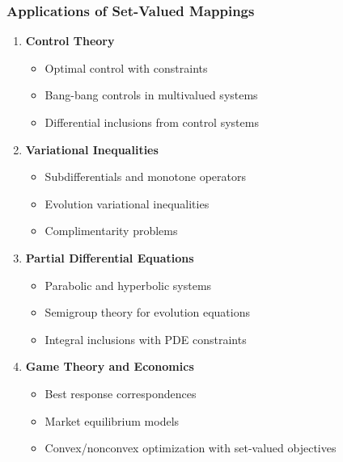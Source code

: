 \documentclass[aspectratio=169,10pt]{beamer}
\begin{document}
\begin{frame}
\frametitle{Applications of Set-Valued Mappings}

\begin{enumerate}
    \item \textbf{Control Theory}
    \begin{itemize}
        \item Optimal control with constraints
        \item Bang-bang controls in multivalued systems
        \item Differential inclusions from control systems
    \end{itemize}

    \vspace{0.3cm}

    \item \textbf{Variational Inequalities}
    \begin{itemize}
        \item Subdifferentials and monotone operators
        \item Evolution variational inequalities
        \item Complimentarity problems
    \end{itemize}

    \vspace{0.3cm}

    \item \textbf{Partial Differential Equations}
    \begin{itemize}
        \item Parabolic and hyperbolic systems
        \item Semigroup theory for evolution equations
        \item Integral inclusions with PDE constraints
    \end{itemize}

    \vspace{0.3cm}

    \item \textbf{Game Theory and Economics}
    \begin{itemize}
        \item Best response correspondences
        \item Market equilibrium models
        \item Convex/nonconvex optimization with set-valued objectives
    \end{itemize}
\end{enumerate}

\end{frame}
\end{document}
